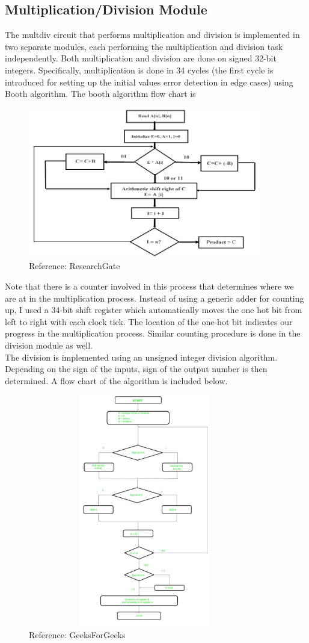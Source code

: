 \documentclass{article}
\begin{document}
		\subsection{Multiplication/Division Module}
		The multdiv circuit that performs multiplication and division is implemented in two separate modules, each performing the multiplication and division task independently. Both multiplication and division are done on signed 32-bit integers. Specifically, multiplication is done in 34 cycles (the first cycle is introduced for setting up the initial values error detection in edge cases) using Booth algorithm. The booth algorithm flow chart is
		\begin{figure}[!h]
			\centering
			\includegraphics[width=4in]{booth}
			\caption{Reference: ResearchGate}
		\end{figure}
		Note that there is a counter involved in this process that determines where we are at in the multiplication process. Instead of using a generic adder for counting up, I used a 34-bit shift register which automatically moves the one hot bit from left to right with each clock tick. The location of the one-hot bit indicates our progress in the multiplication process. Similar counting procedure is done in the division module as well. \\
		The division is implemented using an unsigned integer division algorithm. Depending on the sign of the inputs, sign of the output number is then determined. A flow chart of the algorithm is included below.
		\begin{figure}[h]
			\centering
			\includegraphics[width=4in, height=4in]{unsigned_division}
			\caption{Reference: GeeksForGeeks}
		\end{figure}
\end{document}
